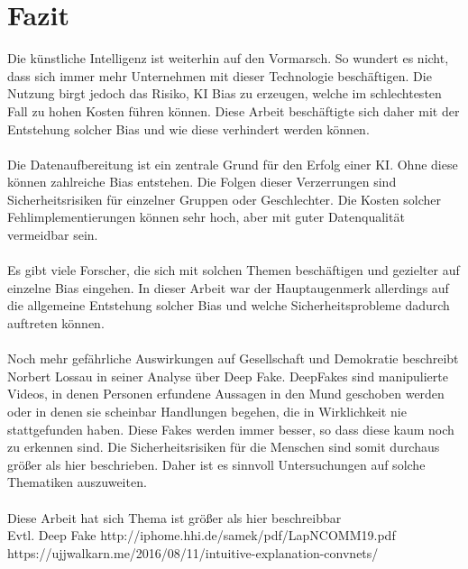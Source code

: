 \documentclass[12pt,oneside,a4paper,parskip]{scrbook}
\begin{document}
\chapter{Fazit}
Die künstliche Intelligenz ist weiterhin auf den Vormarsch. So wundert es nicht, dass sich immer mehr Unternehmen mit dieser Technologie beschäftigen. Die Nutzung birgt jedoch das Risiko, KI Bias zu erzeugen, welche im schlechtesten Fall zu hohen Kosten führen können. Diese Arbeit beschäftigte sich daher mit der Entstehung solcher Bias und wie diese verhindert werden können.
\\\\
Die Datenaufbereitung ist ein zentrale Grund für den Erfolg einer KI. Ohne diese können zahlreiche Bias entstehen. Die Folgen dieser Verzerrungen sind Sicherheitsrisiken für einzelner Gruppen oder Geschlechter. Die Kosten solcher Fehlimplementierungen können sehr hoch, aber mit guter Datenqualität vermeidbar sein.
\\\\
Es gibt viele Forscher, die sich mit solchen Themen beschäftigen und gezielter auf einzelne Bias eingehen. In dieser Arbeit war der Hauptaugenmerk allerdings auf die allgemeine Entstehung solcher Bias und welche Sicherheitsprobleme dadurch auftreten können.
\\\\
Noch mehr gefährliche Auswirkungen auf Gesellschaft und Demokratie beschreibt Norbert Lossau in seiner Analyse über Deep Fake\cite{deepFake}. DeepFakes sind manipulierte Videos, in denen Personen erfundene Aussagen in den Mund geschoben werden oder in denen sie scheinbar Handlungen begehen, die in Wirklichkeit nie stattgefunden haben. Diese Fakes werden immer besser, so dass diese kaum noch zu erkennen sind. Die Sicherheitsrisiken für die Menschen sind somit durchaus größer als hier beschrieben. Daher ist es sinnvoll Untersuchungen auf solche Thematiken auszuweiten.
\\\\
Diese Arbeit hat sich 
Thema ist größer als hier beschreibbar
\\Evtl. Deep Fake
http://iphome.hhi.de/samek/pdf/LapNCOMM19.pdf
https://ujjwalkarn.me/2016/08/11/intuitive-explanation-convnets/


\backmatter


\cleardoublepage
{}
{}
\printbibliography
\end{document}

